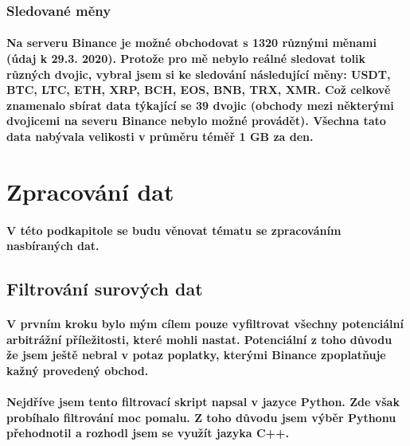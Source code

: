 \documentclass[thesis=B,czech]{FITthesis}[2019/03/21]
\begin{document}
\subsubsection{Sledované měny}
\paragraph{
Na serveru Binance je možné obchodovat s 1320 různými měnami (údaj k 29.3. 2020). Protože pro mě nebylo reálné sledovat tolik různých dvojic, vybral jsem si ke sledování následující měny: USDT, BTC, LTC, ETH, XRP, BCH, EOS, BNB, TRX, XMR. Což celkově znamenalo sbírat data týkající se 39 dvojic (obchody mezi některými dvojicemi na severu Binance nebylo možné provádět). Všechna tato data nabývala velikosti v průměru téměř 1 GB za den.
}
\section{Zpracování dat}
\paragraph{
V této podkapitole se budu věnovat tématu se zpracováním nasbíraných dat.
}
\subsection{Filtrování surových dat}
\paragraph{
V prvním kroku bylo mým cílem pouze vyfiltrovat všechny potenciální arbitrážní příležitosti, které mohli nastat. Potenciální z toho důvodu že jsem ještě nebral v potaz poplatky, kterými Binance zpoplatňuje kažný provedený obchod.
}
\paragraph{
Nejdříve jsem tento filtrovací skript napsal v jazyce Python. Zde však probíhalo filtrování moc pomalu. Z toho důvodu jsem výběr Pythonu přehodnotil a rozhodl jsem se využít jazyka C++. 
}
\end{document}

